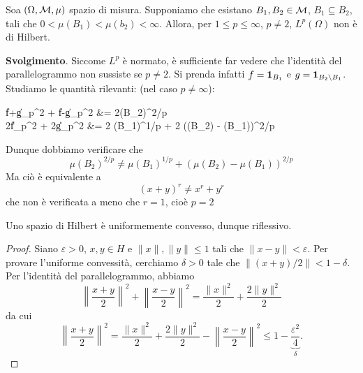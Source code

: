 \begin{exercise}
	Soa $(\Omega, \mathcal{M}, \mu)$ spazio di misura. Supponiamo che esistano $B_1, B_2 \in \mathcal{M}$, $B_1 \subseteq B_2$, tali che $0 < \mu(B_1) < \mu(b_2) < \infty$.
	Allora, per $1 \leq p \leq \infty$, $p \neq 2$, $L^p(\Omega)$ non è di Hilbert.

	\textbf{Svolgimento}.
	Siccome $L^p$ è normato, è sufficiente far vedere che l'identità del parallelogrammo non sussiste se $p \neq 2$. Si prenda infatti $f = {\boldsymbol{1}}_{B_1}$ e $g={\boldsymbol{1}}_{B_2 \setminus B_1}$.
	Studiamo le quantità rilevanti: (nel caso $p \neq \infty$):
	\begin{eqalign*}
		\|f+g\|_p^2 + \|f-g\|_p^2 &= 2\mu(B_2)^{2/p}\\
		2\|f\|_p^2 + 2\|g\|_p^2 &= 2 \mu(B_1)^{1/p} + 2 (\mu(B_2) - \mu(B_1))^{2/p}
	\end{eqalign*}
	Dunque dobbiamo verificare che
	\begin{equation*}
		\mu(B_2)^{2/p} \neq \mu(B_1)^{1/p} + (\mu(B_2) - \mu(B_1))^{2/p}
	\end{equation*}
	Ma ciò è equivalente a
	\begin{equation}
		(x+y)^r \neq x^r + y^r
	\end{equation}
	che non è verificata a meno che $r=1$, cioè $p=2$
\end{exercise}

\begin{theorem}
\label{th:hilb_reflexiv}
	Uno spazio di Hilbert è uniformemente convesso, dunque riflessivo.
\end{theorem}
\begin{proof}
	Siano $\varepsilon > 0$, $x,y \in H$ e $\|x\|, \|y\| \leq 1$ tali che $\|x-y\| < \varepsilon$. Per provare l'uniforme convessità, cerchiamo $\delta >0$ tale che $\|(x+y)/2\| < 1-\delta$.
	Per l'identità del parallelogrammo, abbiamo
	\begin{equation*}
		\left\|\frac{x+y}2\right\|^2+\left\|\frac{x-y}2\right\|^2 = \frac{\|x\|^2}2 + \frac{2\|y\|^2}2
	\end{equation*}
	da cui
	\begin{equation*}
		\left\|\frac{x+y}2\right\|^2 = \frac{\|x\|^2}2 + \frac{2\|y\|^2}2 - \left\|\frac{x-y}2\right\|^2 \leq 1 - \underbrace{\frac{\varepsilon^2}4}_\delta.
	\end{equation*}
\end{proof}

